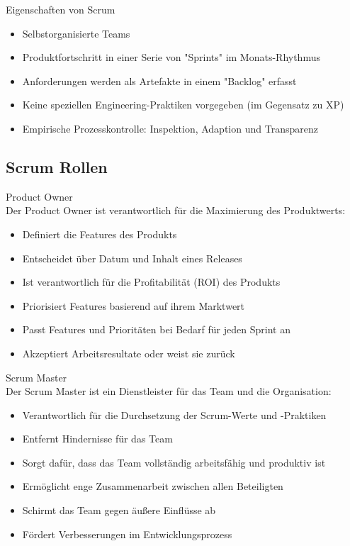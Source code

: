 \begin{concept}{Eigenschaften von Scrum}\\
    \begin{itemize}
        \item Selbstorganisierte Teams
        \item Produktfortschritt in einer Serie von "Sprints" im Monats-Rhythmus
        \item Anforderungen werden als Artefakte in einem "Backlog" erfasst
        \item Keine speziellen Engineering-Praktiken vorgegeben (im Gegensatz zu XP)
        \item Empirische Prozesskontrolle: Inspektion, Adaption und Transparenz
    \end{itemize}
\end{concept}

\subsection{Scrum Rollen}

\begin{definition}{Product Owner}\\
    Der Product Owner ist verantwortlich für die Maximierung des Produktwerts:
    \begin{itemize}
        \item Definiert die Features des Produkts
        \item Entscheidet über Datum und Inhalt eines Releases
        \item Ist verantwortlich für die Profitabilität (ROI) des Produkts
        \item Priorisiert Features basierend auf ihrem Marktwert
        \item Passt Features und Prioritäten bei Bedarf für jeden Sprint an
        \item Akzeptiert Arbeitsresultate oder weist sie zurück
    \end{itemize}
\end{definition}

\begin{definition}{Scrum Master}\\
    Der Scrum Master ist ein Dienstleister für das Team und die Organisation:
    \begin{itemize}
        \item Verantwortlich für die Durchsetzung der Scrum-Werte und -Praktiken
        \item Entfernt Hindernisse für das Team
        \item Sorgt dafür, dass das Team vollständig arbeitsfähig und produktiv ist
        \item Ermöglicht enge Zusammenarbeit zwischen allen Beteiligten
        \item Schirmt das Team gegen äußere Einflüsse ab
        \item Fördert Verbesserungen im Entwicklungsprozess
    \end{itemize}
\end{definition}

